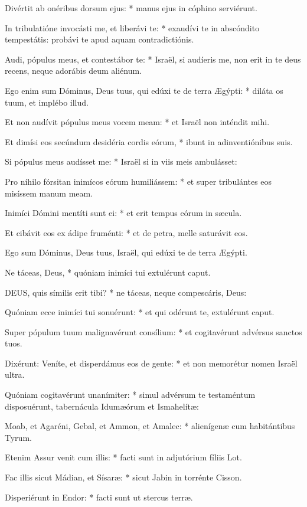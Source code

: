 Divértit ab onéribus dorsum ejus: * manus ejus in cóphino serviérunt.

In tribulatióne invocásti me, et liberávi te: * exaudívi te in abscóndito tempestátis: probávi te apud aquam contradictiónis.

Audi, pópulus meus, et contestábor te: * Israël, si audíeris me, non erit in te deus recens, neque adorábis deum aliénum.

Ego enim sum Dóminus, Deus tuus, qui edúxi te de terra Ægýpti: * diláta os tuum, et implébo illud.

Et non audívit pópulus meus vocem meam: * et Israël non inténdit mihi.

Et dimísi eos secúndum desidéria cordis eórum, * ibunt in adinventiónibus suis.

Si pópulus meus audísset me: * Israël si in viis meis ambulásset:

Pro níhilo fórsitan inimícos eórum humiliássem: * et super tribulántes eos misíssem manum meam.

Inimíci Dómini mentíti sunt ei: * et erit tempus eórum in sæcula.

Et cibávit eos ex ádipe fruménti: * et de petra, melle saturávit eos.

 Ego sum Dóminus, Deus tuus, Israël, qui edúxi te de terra Ægýpti.

 Ne táceas, Deus, * quóniam inimíci tui extulérunt caput.


\lettrine[lines=2]{D}{EUS}, quis símilis erit tibi? * ne táceas, neque compescáris, Deus:

Quóniam ecce inimíci tui sonuérunt: * et qui odérunt te, extulérunt caput.

Super pópulum tuum malignavérunt consílium: * et cogitavérunt advérsus sanctos tuos.

Dixérunt: Veníte, et disperdámus eos de gente: * et non memorétur nomen Israël ultra.

Quóniam cogitavérunt unanímiter: * simul advérsum te testaméntum disposuérunt, tabernácula Idumæórum et Ismahelítæ:

Moab, et Agaréni, Gebal, et Ammon, et Amalec: * alienígenæ cum habitántibus Tyrum.

Etenim Assur venit cum illis: * facti sunt in adjutórium fíliis Lot.

Fac illis sicut Mádian, et Sísaræ: * sicut Jabin in torrénte Cisson.

Disperiérunt in Endor: * facti sunt ut stercus terræ.

